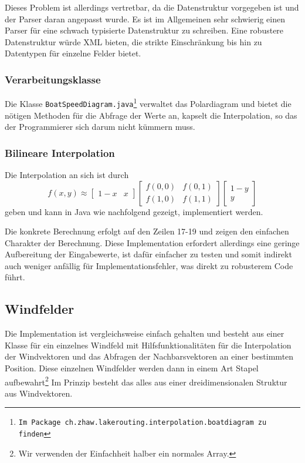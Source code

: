 Dieses Problem ist allerdings vertretbar, da die Datenstruktur vorgegeben ist
und der Parser daran angepasst wurde. Es ist im Allgemeinen sehr schwierig
einen Parser für eine schwach typisierte Datenstruktur zu schreiben. Eine
robustere Datenstruktur würde XML bieten, die strikte Einschränkung bis hin zu
Datentypen für einzelne Felder bietet.

\subsubsection{Verarbeitungsklasse}
Die Klasse \texttt{BoatSpeedDiagram.java\footnote{Im Package
ch.zhaw.lakerouting.interpolation.boatdiagram zu finden}} verwaltet das
Polardiagram und bietet die nötigen Methoden für die Abfrage der Werte an,
kapselt die Interpolation, so das der Programmierer sich darum nicht kümmern
muss.

\subsubsection{Bilineare Interpolation}\label{sss:bilinearinterpolation}
Die Interpolation an sich ist durch 
\begin{equation}
f(x,y) \approx \begin{bmatrix} 1-x & x \end{bmatrix} \begin{bmatrix}
f(0,0) & f(0,1) \\ f(1,0) & f(1,1) \end{bmatrix} \begin{bmatrix} 1 - y
\\ y \end{bmatrix}
\label{eq:bilineareinterpolation}
\end{equation}
geben und kann in Java wie nachfolgend gezeigt, implementiert werden.

 
Die konkrete Berechnung erfolgt auf den Zeilen 17-19 und zeigen den einfachen
Charakter der Berechnung. Diese Implementation erfordert allerdings eine
geringe Aufbereitung der Eingabewerte, ist dafür einfacher zu testen und somit
indirekt auch weniger anfällig für Implementationsfehler, was direkt zu
robusterem Code führt.

\subsection{Windfelder}
Die Implementation ist vergleichsweise einfach gehalten und besteht aus einer
Klasse für ein einzelnes Windfeld mit Hilfsfunktionalitäten für die
Interpolation der Windvektoren und das Abfragen der Nachbarsvektoren an einer
bestimmten Position. Diese einzelnen Windfelder werden dann in einem Art Stapel
aufbewahrt\footnote{Wir verwenden der Einfachheit halber ein normales Array.}
Im Prinzip besteht das alles aus einer dreidimensionalen Struktur aus
Windvektoren.

